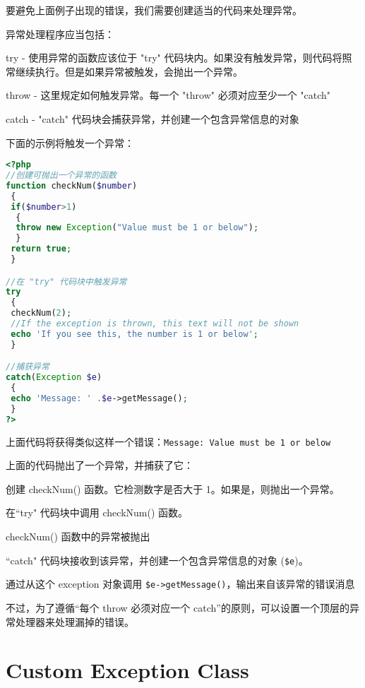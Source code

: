 要避免上面例子出现的错误，我们需要创建适当的代码来处理异常。




异常处理程序应当包括：



\begin{compactenum}
\item try - 使用异常的函数应该位于 "try" 代码块内。如果没有触发异常，则代码将照常继续执行。但是如果异常被触发，会抛出一个异常。
\item throw - 这里规定如何触发异常。每一个 "throw" 必须对应至少一个 "catch"
\item catch - "catch" 代码块会捕获异常，并创建一个包含异常信息的对象
\end{compactenum}

下面的示例将触发一个异常：

\begin{lstlisting}[language=PHP]
<?php
//创建可抛出一个异常的函数
function checkNum($number)
 {
 if($number>1)
  {
  throw new Exception("Value must be 1 or below");
  }
 return true;
 }

//在 "try" 代码块中触发异常
try
 {
 checkNum(2);
 //If the exception is thrown, this text will not be shown
 echo 'If you see this, the number is 1 or below';
 }

//捕获异常
catch(Exception $e)
 {
 echo 'Message: ' .$e->getMessage();
 }
?>
\end{lstlisting}


上面代码将获得类似这样一个错误：\verb|Message: Value must be 1 or below|

上面的代码抛出了一个异常，并捕获了它：

\begin{compactenum}
\item 创建 checkNum() 函数。它检测数字是否大于 1。如果是，则抛出一个异常。
\item 在``try" 代码块中调用 checkNum() 函数。
\item checkNum() 函数中的异常被抛出
\item ``catch" 代码块接收到该异常，并创建一个包含异常信息的对象 (\texttt{\$e})。
\item 通过从这个 exception 对象调用 \texttt{\$e->getMessage()}，输出来自该异常的错误消息
\end{compactenum}

不过，为了遵循“每个 throw 必须对应一个 catch”的原则，可以设置一个顶层的异常处理器来处理漏掉的错误。



\section{Custom Exception Class}

